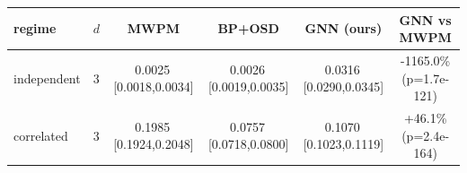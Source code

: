 \begin{tabular}{llccc c}
\toprule
regime & $d$ & MWPM & BP+OSD & GNN (ours) & GNN vs MWPM \\
\midrule
independent & 3 & 0.0025\,[0.0018,0.0034] & 0.0026\,[0.0019,0.0035] & 0.0316\,[0.0290,0.0345] & -1165.0\% (p=1.7e-121) \\
\midrule
correlated & 3 & 0.1985\,[0.1924,0.2048] & 0.0757\,[0.0718,0.0800] & 0.1070\,[0.1023,0.1119] & +46.1\% (p=2.4e-164) \\
\bottomrule
\end{tabular}